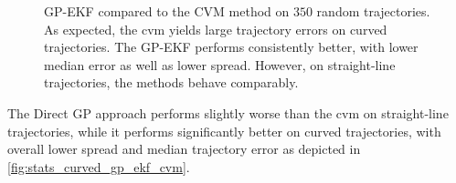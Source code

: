 \begin{figure}[h]
    \centering
    \caption{GP-EKF compared to the CVM method on $350$ random trajectories. As expected, the \acrshort{cvm} yields large trajectory errors on curved trajectories. The GP-EKF performs consistently better, with lower median error as well as lower spread. However, on straight-line trajectories, the methods behave comparably.}
    \label{fig:stats_curved_posgp_cvm}
\end{figure}
The Direct GP approach performs slightly worse than the \acrshort{cvm} on straight-line trajectories, while it performs significantly better on curved trajectories, with overall lower spread and median trajectory error as depicted in \cref{fig:stats_curved_gp_ekf_cvm}.

